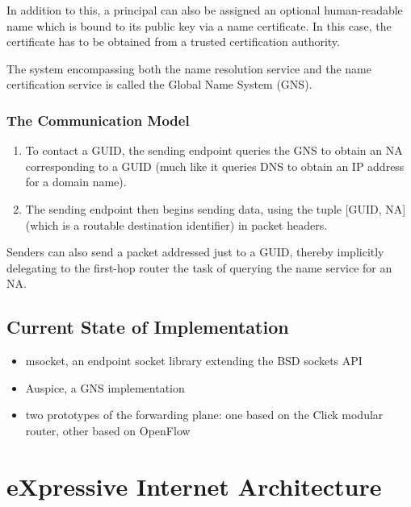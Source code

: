                 In addition to this, a principal can also be assigned an optional human-readable name which is bound to its public key via a name certificate. In this case, the certificate has to be obtained from a trusted certification authority.

                The system encompassing both the name resolution service and the name certification service is called the Global Name System (GNS).

            \subsubsection{The Communication Model}

                \begin{enumerate}
                    \item To contact a GUID, the sending endpoint queries the GNS to obtain an NA corresponding to a GUID (much like it queries DNS to obtain an IP address for a domain name).
                    \item The sending endpoint then begins sending data, using the tuple [GUID, NA] (which is a routable destination identifier) in packet headers.
                \end{enumerate}

                Senders can also send a packet addressed just to a GUID, thereby implicitly delegating to the first-hop router the task of querying the name service for an NA.

        \subsection{Current State of Implementation}

            \begin{itemize}
                \item msocket, an endpoint socket library extending the BSD sockets API
                \item Auspice, a GNS implementation
                \item two prototypes of the forwarding plane: one based on the Click modular router, other based on OpenFlow
            \end{itemize}

    \section{eXpressive Internet Architecture}\label{archs:xia}

